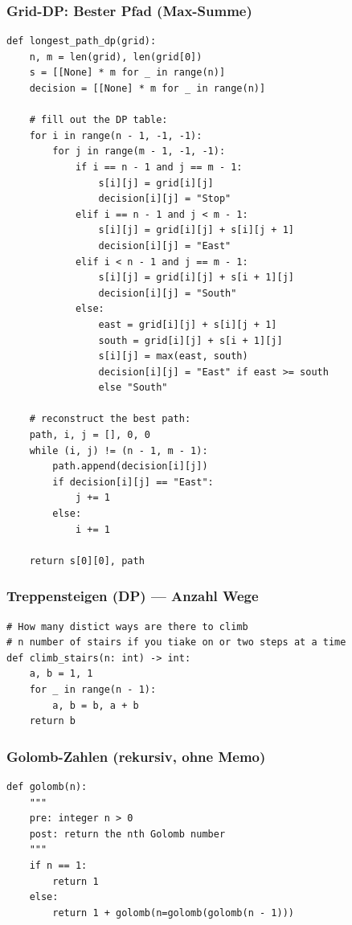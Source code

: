 \subsubsection{Grid-DP: Bester Pfad (Max-Summe)}
\begin{codebox}
\begin{lstlisting}[style=CodeExpert]
def longest_path_dp(grid):
    n, m = len(grid), len(grid[0])
    s = [[None] * m for _ in range(n)]
    decision = [[None] * m for _ in range(n)]

    # fill out the DP table:
    for i in range(n - 1, -1, -1):
        for j in range(m - 1, -1, -1):
            if i == n - 1 and j == m - 1:
                s[i][j] = grid[i][j]
                decision[i][j] = "Stop"
            elif i == n - 1 and j < m - 1:
                s[i][j] = grid[i][j] + s[i][j + 1]
                decision[i][j] = "East"
            elif i < n - 1 and j == m - 1:
                s[i][j] = grid[i][j] + s[i + 1][j]
                decision[i][j] = "South"
            else:
                east = grid[i][j] + s[i][j + 1]
                south = grid[i][j] + s[i + 1][j]
                s[i][j] = max(east, south)
                decision[i][j] = "East" if east >= south
                else "South"

    # reconstruct the best path:
    path, i, j = [], 0, 0
    while (i, j) != (n - 1, m - 1):
        path.append(decision[i][j])
        if decision[i][j] == "East":
            j += 1
        else:
            i += 1

    return s[0][0], path
\end{lstlisting}
\end{codebox}

\subsubsection{Treppensteigen (DP) — Anzahl Wege}
\begin{codebox}
\begin{lstlisting}[style=CodeExpert]
# How many distict ways are there to climb
# n number of stairs if you tiake on or two steps at a time
def climb_stairs(n: int) -> int:
    a, b = 1, 1
    for _ in range(n - 1):
        a, b = b, a + b
    return b

\end{lstlisting}
\end{codebox}

\subsubsection{Golomb-Zahlen (rekursiv, ohne Memo)}
\begin{codebox}
\begin{lstlisting}[style=CodeExpert]
def golomb(n):
    """
    pre: integer n > 0
    post: return the nth Golomb number
    """
    if n == 1:
        return 1
    else:
        return 1 + golomb(n=golomb(golomb(n - 1)))
\end{lstlisting}
\end{codebox}





